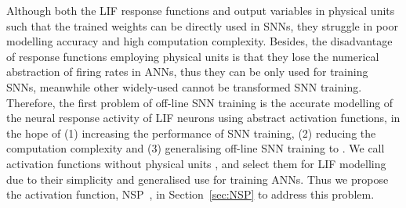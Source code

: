 	
	Although both the \DIFaddbegin {}\DIFaddend LIF response functions \DIFdelbegin {}\DIFdelend \DIFaddbegin {}\DIFaddend and output variables in physical units such that the trained weights can be directly used in SNNs, they struggle in \DIFaddbegin {}\DIFaddend poor modelling accuracy and high computation complexity.
	Besides, the disadvantage of response functions employing physical units is that they lose the numerical abstraction of firing rates in ANNs, thus they can be only used for training SNNs, meanwhile other widely-used \DIFdelbegin {}\DIFdelend \DIFaddbegin {}\DIFaddend cannot be transformed \DIFdelbegin {}\DIFdelend \DIFaddbegin {}\DIFaddend SNN training. 
	Therefore, the first problem of off-line SNN training is the accurate modelling of the neural response activity of LIF neurons using abstract activation functions, in the hope of (1) increasing the performance of SNN training, (2) reducing the computation complexity and (3) generalising off-line SNN training to \DIFdelbegin {}\DIFdelend \DIFaddbegin {}\DIFaddend .
	We call activation functions  \DIFdelbegin {}\DIFdelend without physical units \DIFdelbegin {}\DIFdelend \DIFaddbegin {}\DIFaddend , and select them for LIF modelling due to their simplicity and generalised use for training ANNs.
	Thus we propose the activation function, NSP~\DIFdelbegin {}\DIFdelend \DIFaddbegin {}\DIFaddend , in Section~\ref{sec:NSP} to address this problem.

	
	
